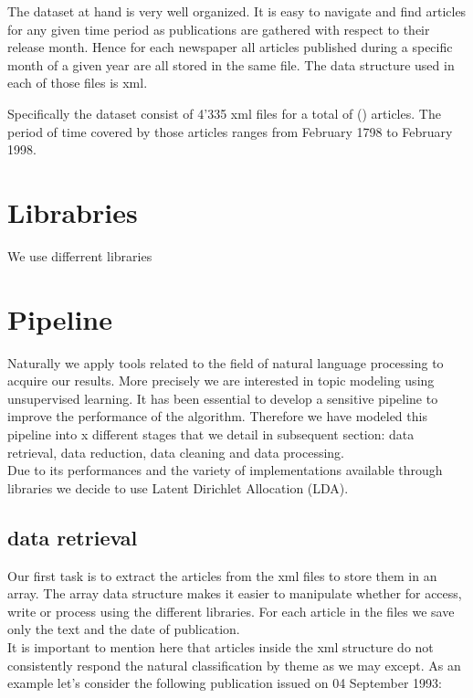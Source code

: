 \documentclass[11pt]{article}
\begin{document}
The dataset at hand is very well organized. It is easy to navigate and find articles for any given time
period as publications are gathered with respect to their release month. Hence for each newspaper all articles published during a specific month of a given year are all stored in the same file. The data structure used in each of those files is xml.

Specifically the dataset consist of 4'335 xml files for a total of () articles. The period of time covered by those articles ranges from February 1798 to February 1998.

\section{Librabries}

We use differrent libraries
\section{Pipeline}

Naturally we apply tools related to the field of natural language processing to acquire our results. More
precisely we are interested in topic modeling using unsupervised learning. It has been essential to develop
a sensitive pipeline to improve the performance of the algorithm. Therefore we have modeled this pipeline into x different stages that we detail in subsequent section: data retrieval, data reduction, data cleaning and data processing.
\\
Due to its performances and the variety of implementations available through libraries we decide to use Latent Dirichlet Allocation (LDA). 
\subsection{data retrieval}

Our first task is to extract the articles from the xml files to store them in an array. The array data structure makes it easier to manipulate whether for access, write or process using the different
libraries. For each article in the files we save only the text and the date of publication.\\
It is important to mention here that articles inside the xml structure do not consistently respond the natural classification by theme as we may except. As an example let's consider the following publication issued on 04 September 1993:\\
\end{document}
